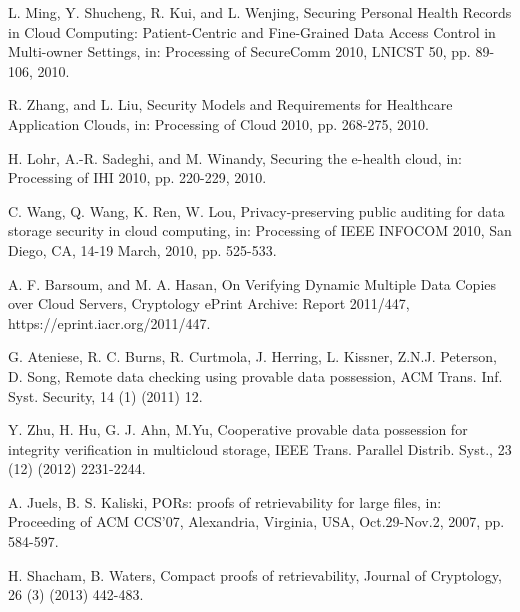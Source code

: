 \documentclass[UTF8]{ctexart}
\begin{document}
\begin{thebibliography}{00}
L. Ming, Y. Shucheng, R. Kui, and L. Wenjing, Securing Personal Health Records in Cloud Computing: Patient-Centric and Fine-Grained
Data Access Control in Multi-owner Settings, in: Processing of SecureComm 2010, LNICST 50, pp. 89-106, 2010.

R. Zhang, and L. Liu, Security Models and Requirements for Healthcare Application Clouds, in: Processing of  Cloud 2010, pp. 268-275, 2010.

H. Lohr, A.-R. Sadeghi, and M. Winandy, Securing the e-health cloud, in: Processing of  IHI 2010, pp. 220-229, 2010.

C. Wang, Q. Wang, K. Ren, W. Lou, Privacy-preserving public auditing for data storage security in cloud computing, in: Processing of IEEE INFOCOM 2010, San Diego, CA, 14-19 March, 2010, pp. 525-533.

A. F. Barsoum, and M. A. Hasan, On Verifying Dynamic Multiple Data Copies over Cloud Servers, Cryptology ePrint Archive: Report 2011/447, https://eprint.iacr.org/2011/447.


G. Ateniese, R. C. Burns, R. Curtmola, J. Herring, L. Kissner, Z.N.J. Peterson, D. Song,  Remote data checking using provable data possession, ACM Trans. Inf. Syst. Security, 14 (1) (2011) 12.

Y. Zhu, H. Hu, G. J. Ahn, M.Yu, Cooperative provable data possession for integrity verification in multicloud storage, IEEE Trans. Parallel Distrib. Syst., 23 (12) (2012) 2231-2244.


A. Juels, B. S. Kaliski, PORs: proofs of retrievability for large files, in: Proceeding of ACM CCS'07, Alexandria, Virginia, USA, Oct.29-Nov.2, 2007, pp. 584-597.

H. Shacham, B. Waters, Compact proofs of retrievability, Journal of Cryptology, 26 (3) (2013) 442-483.



\end{thebibliography}
\end{document}
